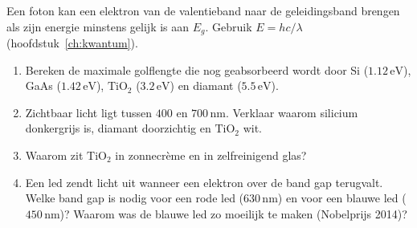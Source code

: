 \begin{oefening}
Een foton kan een elektron van de valentieband naar de geleidingsband brengen als zijn energie minstens gelijk is aan \(E_g\). Gebruik \(E = hc/\lambda\) (hoofdstuk~\ref{ch:kwantum}).

\begin{enumerate}
\item[(a)]
  Bereken de maximale golflengte die nog geabsorbeerd wordt door Si (\(1.12\,\mathrm{eV}\)), GaAs (\(1.42\,\mathrm{eV}\)), \(\mathrm{TiO_2}\) (\(3.2\,\mathrm{eV}\)) en diamant (\(5.5\,\mathrm{eV}\)).
\item[(b)]
  Zichtbaar licht ligt tussen \(400\) en \(700\,\mathrm{nm}\). Verklaar waarom silicium donkergrijs is, diamant doorzichtig en \(\mathrm{TiO_2}\) wit.
\item[(c)]
  Waarom zit \(\mathrm{TiO_2}\) in zonnecrème en in zelfreinigend glas?
\item[(d)]
  Een led zendt licht uit wanneer een elektron over de band gap terugvalt. Welke band gap is nodig voor een rode led (\(630\,\mathrm{nm}\)) en voor een blauwe led (\(450\,\mathrm{nm}\))? Waarom was de blauwe led zo moeilijk te maken (Nobelprijs 2014)?
\end{enumerate}
\end{oefening}
